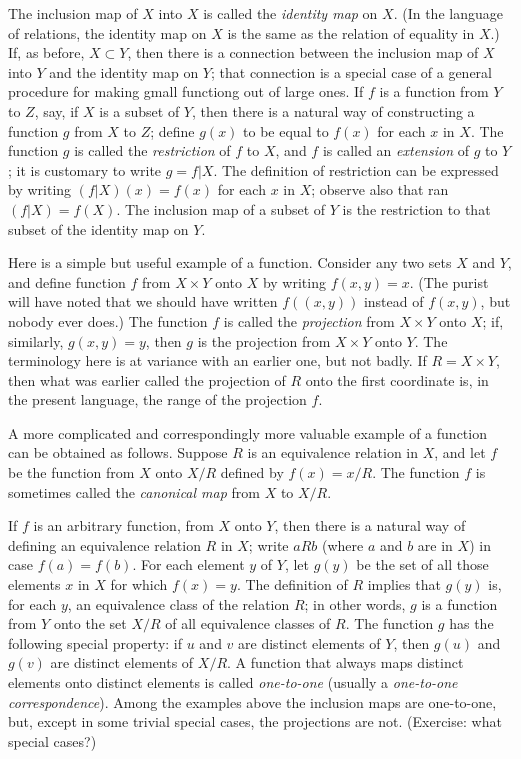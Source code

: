 The inclusion map of $X$ into $X$ is called the \textit{identity map} on $X$. (In the language of relations, the identity map on $X$ is the same as the relation of equality in $X$.) If, as before, $X \subset Y$, then there is a connection between the inclusion map of $X$ into $Y$ and the identity map on $Y$; that connection is a special case of a general procedure for making gmall functiong out of large ones. If $f$ is a function from $Y$ to $Z$, say, if $X$ is a subset of $Y$, then there is a natural way of constructing a function $g$ from $X$ to $Z$; define $g(x)$ to be equal to $f(x)$ for each $x$ in $X$. The function $g$ is called the \textit{restriction} of $f$ to $X$, and $f$ is called an \textit{extension} of $g$ to $Y$; it is customary to write $g = f|X$. The definition of restriction can be expressed by writing $(f|X)(x) = f(x)$ for each $x$ in $X$; observe also that ran $(f|X) = f(X)$. The inclusion map of a subset of $Y$ is the restriction to that subset of the identity map on $Y$. 

Here is a simple but useful example of a function. Consider any two sets $X$ and $Y$, and define function $f$ from $X \times Y$ onto $X$ by writing $f(x,y) = x$. (The purist  will have noted that we should have written $f((x, y))$ instead of $f(x, y)$, but nobody ever does.) The function $f$ is called the \textit{projection} from $X \times Y$ onto $X$; if, similarly, $g(x, y) = y$, then $g$ is the projection from $X \times Y$ onto $Y$. The terminology here is at variance with an earlier one, but not badly. If $R = X \times Y$, then what was earlier called the projection of $R$ onto the first coordinate is, in the present language, the range of the projection $f$.

A more complicated and correspondingly more valuable example of a function can be obtained as follows. Suppose $R$ is an equivalence relation in $X$, and let $f$ be the function from $X$ onto $X/R$ defined by $f(x) = x/R$. The function $f$ is sometimes called the \textit{canonical map} from $X$ to $X/R$.

If $f$ is an arbitrary function, from $X$ onto $Y$, then there is a natural way of defining an equivalence relation $R$ in $X$; write $a R b$ (where $a$ and $b$ are in $X$) in case $f(a) = f(b)$. For each element $y$ of $Y$, let $g(y)$ be the set of all those elements $x$ in $X$ for which $f(x) = y$. The definition of $R$ implies that $g(y)$ is, for each $y$, an equivalence class of the relation $R$; in other words, $g$ is a function from $Y$ onto the set $X/R$ of all equivalence classes of $R$. The function $g$ has the following special property: if $u$ and $v$ are distinct elements of $Y$, then $g(u)$ and $g(v)$ are distinct elements of $X/R$. A function that always maps distinct elements onto distinct elements is called \textit{one-to-one} (usually a \textit{one-to-one correspondence}). Among the examples above the inclusion maps are one-to-one, but, except in some trivial special cases, the projections are not. (Exercise: what special cases?)

